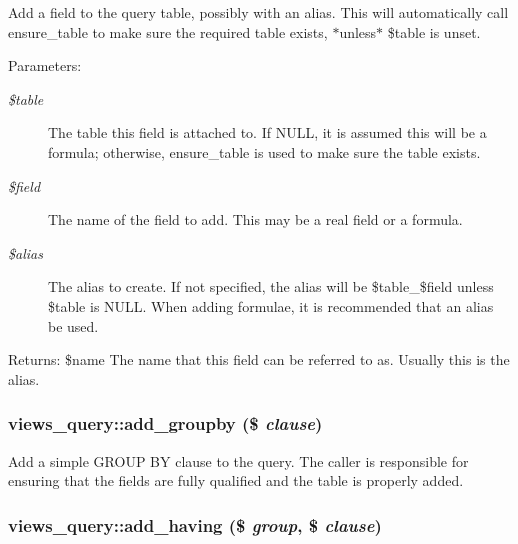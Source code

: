 Add a field to the query table, possibly with an alias. This will automatically call ensure\_\-table to make sure the required table exists, $\ast$unless$\ast$ \$table is unset.

\begin{Desc}
\item[Parameters:]
\begin{description}
\item[{\em \$table}]The table this field is attached to. If NULL, it is assumed this will be a formula; otherwise, ensure\_\-table is used to make sure the table exists. \item[{\em \$field}]The name of the field to add. This may be a real field or a formula. \item[{\em \$alias}]The alias to create. If not specified, the alias will be \$table\_\-\$field unless \$table is NULL. When adding formulae, it is recommended that an alias be used.\end{description}
\end{Desc}
\begin{Desc}
\item[Returns:]\$name The name that this field can be referred to as. Usually this is the alias. \end{Desc}
\hypertarget{classviews__query_089b7eab81ec9cb4b24aa489ff4ac448}{
\subsubsection[{add\_\-groupby}]{\setlength{\rightskip}{0pt plus 5cm}views\_\-query::add\_\-groupby (\$ {\em clause})}}
\label{classviews__query_089b7eab81ec9cb4b24aa489ff4ac448}


Add a simple GROUP BY clause to the query. The caller is responsible for ensuring that the fields are fully qualified and the table is properly added. \hypertarget{classviews__query_db01fc3898236d7f3c9134cd5971ff67}{
\subsubsection[{add\_\-having}]{\setlength{\rightskip}{0pt plus 5cm}views\_\-query::add\_\-having (\$ {\em group}, \/  \$ {\em clause})}}
\label{classviews__query_db01fc3898236d7f3c9134cd5971ff67}


